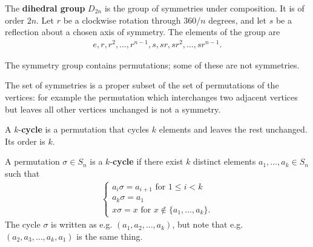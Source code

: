 \begin{definition*}
  The \textbf{dihedral group}
  $D_{2n}$ is the group of symmetries under composition. It is of order $2n$. Let
  $r$ be a clockwise rotation through $360/n$ degrees, and let $s$ be a
  reflection about a chosen axis of symmetry. The elements of the group are
  \begin{align*}
    e, r, r^2, \ldots, r^{n-1}, s, sr, sr^2, \ldots, sr^{n-1}.
  \end{align*}
\end{definition*}

\begin{remark*}
  The symmetry group contains permutations; some of these are not symmetries.

  The set of symmetries is a proper subset of the set of permutations of the vertices: for example
  the permutation which interchanges two adjacent vertices but leaves all other vertices unchanged
  is not a symmetry.
\end{remark*}

\begin{intuition*}
  A $k$-\textbf{cycle} is a permutation that cycles $k$ elements and leaves the rest unchanged. Its
  order is $k$.
\end{intuition*}

\begin{definition*}
  A permutation $\sigma \in S_n$ is a $k$-\textbf{cycle} if there exist $k$ distinct elements
  $a_1, \ldots, a_k \in S_n$ such that
  \begin{align*}
    \begin{cases}
      a_i\sigma = a_{i+1} \text{~for~} 1 \leq i < k\\
      a_k\sigma = a_1\\
      x\sigma = x \text{~for~} x \notin \{a_1, \ldots, a_k\}.
    \end{cases}
  \end{align*}
  The cycle $\sigma$ is written as e.g. $(a_1, a_2, \ldots, a_k)$, but note that e.g.
  $(a_2, a_3, \ldots, a_k, a_1)$ is the same thing.
\end{definition*}

